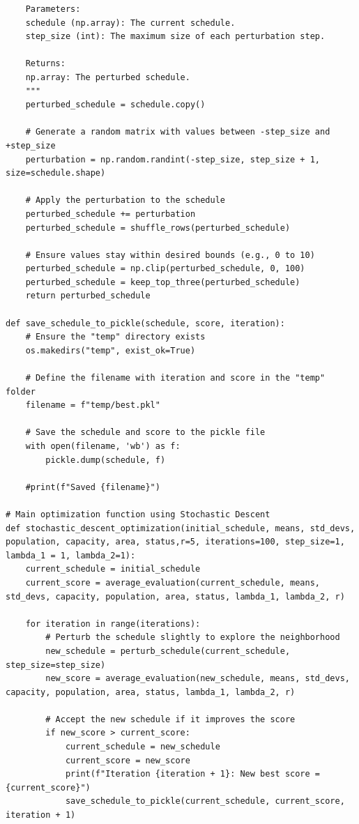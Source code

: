 \documentclass{article}
\begin{document}
\begin{verbatim}
    Parameters:
    schedule (np.array): The current schedule.
    step_size (int): The maximum size of each perturbation step.
    
    Returns:
    np.array: The perturbed schedule.
    """
    perturbed_schedule = schedule.copy()
    
    # Generate a random matrix with values between -step_size and +step_size
    perturbation = np.random.randint(-step_size, step_size + 1, size=schedule.shape)
    
    # Apply the perturbation to the schedule
    perturbed_schedule += perturbation
    perturbed_schedule = shuffle_rows(perturbed_schedule)
    
    # Ensure values stay within desired bounds (e.g., 0 to 10)
    perturbed_schedule = np.clip(perturbed_schedule, 0, 100)
    perturbed_schedule = keep_top_three(perturbed_schedule)
    return perturbed_schedule

def save_schedule_to_pickle(schedule, score, iteration):
    # Ensure the "temp" directory exists
    os.makedirs("temp", exist_ok=True)
    
    # Define the filename with iteration and score in the "temp" folder
    filename = f"temp/best.pkl"
    
    # Save the schedule and score to the pickle file
    with open(filename, 'wb') as f:
        pickle.dump(schedule, f)
    
    #print(f"Saved {filename}")

# Main optimization function using Stochastic Descent
def stochastic_descent_optimization(initial_schedule, means, std_devs, population, capacity, area, status,r=5, iterations=100, step_size=1, lambda_1 = 1, lambda_2=1):
    current_schedule = initial_schedule
    current_score = average_evaluation(current_schedule, means, std_devs, capacity, population, area, status, lambda_1, lambda_2, r)
    
    for iteration in range(iterations):
        # Perturb the schedule slightly to explore the neighborhood
        new_schedule = perturb_schedule(current_schedule, step_size=step_size)
        new_score = average_evaluation(new_schedule, means, std_devs, capacity, population, area, status, lambda_1, lambda_2, r)
        
        # Accept the new schedule if it improves the score
        if new_score > current_score:
            current_schedule = new_schedule
            current_score = new_score
            print(f"Iteration {iteration + 1}: New best score = {current_score}")
            save_schedule_to_pickle(current_schedule, current_score, iteration + 1)


\end{verbatim}
\end{document}
